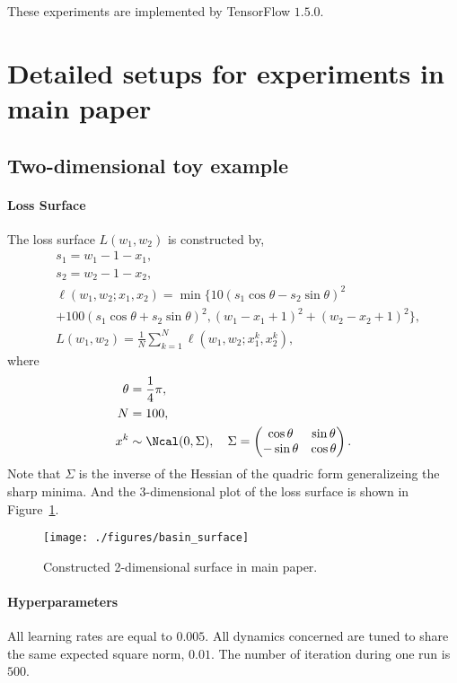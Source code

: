 \documentclass{article}
\begin{document}
These experiments are implemented by TensorFlow $1.5.0$.

\section{Detailed setups for experiments in main paper}

\subsection{Two-dimensional toy example}

\paragraph{Loss Surface}
The loss surface $L(w_1, w_2)$ is constructed by,
\begin{align*}
    &s_1 = w_1 - 1 - x_1, \\
    &s_2 = w_2 - 1 - x_2, \\
    &\ell(w_1, w_2; x_1, x_2) = \min\{10(s_1 \cos \theta  - s_2 \sin \theta )^2 \\
    &+ 100 (s_1 \cos \theta  + s_2 \sin \theta )^2,
       (w_1-x_1+1)^2 + (w_2-x_2+1)^2\}, \\
    &L(w_1, w_2) = \frac{1}{N}\sum^{N}_{k=1} \ell(w_1, w_2; x^k_1, x^k_2),
\end{align*}
where
\begin{align*}
    \theta &= \frac{1}{4}\pi,\\
    N &= 100,\\
    x^k &\sim \Ncal (0, \Sigma),\quad \Sigma = \begin{pmatrix}
        \cos \theta & \sin\theta \\
        -\sin\theta & \cos\theta
    \end{pmatrix}.
\end{align*}
Note that $\Sigma$ is the inverse of the Hessian of the quadric form generalizeing the sharp minima.
And the 3-dimensional plot of the loss surface is shown in Figure~\ref{fig:surface}.

\begin{figure}
    \begin{center}
    \texttt{[image: ./figures/basin\_surface]}
    \caption{Constructed 2-dimensional surface in main paper.}
    \label{fig:surface}
    \end{center}
\end{figure}

\paragraph{Hyperparameters}
All learning rates are equal to $0.005$. All dynamics concerned are tuned to share the same expected square norm, $0.01$. The number of iteration during one run is $500$.
\end{document}
